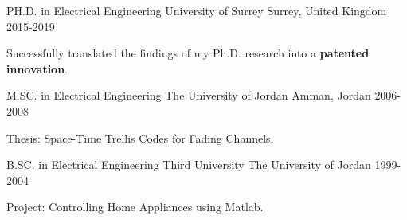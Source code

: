 


\begin{cventries}

  \cventry
    {PH.D. in Electrical Engineering} %
    {University of Surrey} %
    {Surrey, United Kingdom} %
    {2015-2019} %
    {
      \begin{cvitems} %
        \item {Successfully translated the findings of my Ph.D. research into a \textbf{patented innovation}.}
      \end{cvitems}
    }

  \cventry
    {M.SC. in Electrical Engineering} %
    {The University of Jordan} %
    {Amman, Jordan} %
    {2006-2008} %
    {
      \begin{cvitems} %
        \item {Thesis: Space-Time Trellis Codes for Fading Channels.}
      \end{cvitems}
    }

  \cventry
    {B.SC. in Electrical Engineering} %
    {Third University} %
    {The University of Jordan} %
    {1999-2004} %
    {
      \begin{cvitems} %
        \item {Project: Controlling Home Appliances using Matlab.}
      \end{cvitems}
    }

\end{cventries}
